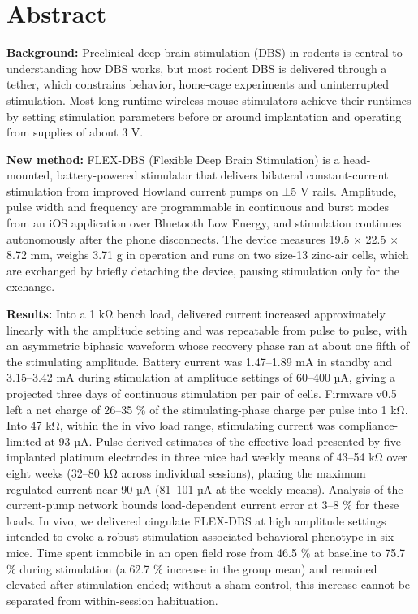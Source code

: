 \section{Abstract}\label{abstract}

\textbf{Background:} Preclinical deep brain stimulation (DBS) in rodents is central to understanding how DBS works, but most rodent DBS is delivered through a tether, which constrains behavior, home-cage experiments and uninterrupted stimulation. Most long-runtime wireless mouse stimulators achieve their runtimes by setting stimulation parameters before or around implantation and operating from supplies of about 3 V.

\textbf{New method:} FLEX-DBS (Flexible Deep Brain Stimulation) is a head-mounted, battery-powered stimulator that delivers bilateral constant-current stimulation from improved Howland current pumps on ±5 V rails. Amplitude, pulse width and frequency are programmable in continuous and burst modes from an iOS application over Bluetooth Low Energy, and stimulation continues autonomously after the phone disconnects. The device measures 19.5 × 22.5 × 8.72 mm, weighs 3.71 g in operation and runs on two size-13 zinc-air cells, which are exchanged by briefly detaching the device, pausing stimulation only for the exchange.

\textbf{Results:} Into a 1 kΩ bench load, delivered current increased approximately linearly with the amplitude setting and was repeatable from pulse to pulse, with an asymmetric biphasic waveform whose recovery phase ran at about one fifth of the stimulating amplitude. Battery current was 1.47--1.89 mA in standby and 3.15--3.42 mA during stimulation at amplitude settings of 60--400 µA, giving a projected three days of continuous stimulation per pair of cells. Firmware v0.5 left a net charge of 26--35 \% of the stimulating-phase charge per pulse into 1 kΩ. Into 47 kΩ, within the in vivo load range, stimulating current was compliance-limited at 93 µA. Pulse-derived estimates of the effective load presented by five implanted platinum electrodes in three mice had weekly means of 43--54 kΩ over eight weeks (32--80 kΩ across individual sessions), placing the maximum regulated current near 90 µA (81--101 µA at the weekly means). Analysis of the current-pump network bounds load-dependent current error at 3--8 \% for these loads. In vivo, we delivered cingulate FLEX-DBS at high amplitude settings intended to evoke a robust stimulation-associated behavioral phenotype in six mice. Time spent immobile in an open field rose from 46.5 \% at baseline to 75.7 \% during stimulation (a 62.7 \% increase in the group mean) and remained elevated after stimulation ended; without a sham control, this increase cannot be separated from within-session habituation.

